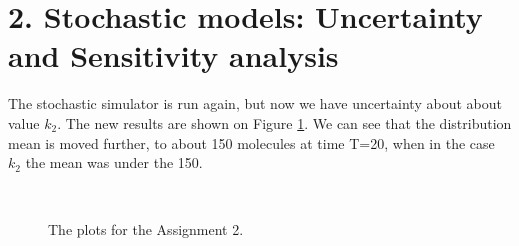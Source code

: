 \documentclass[a4paper,english]{article}
\begin{document}
\section*{2. Stochastic models: Uncertainty and Sensitivity analysis}

The stochastic simulator is run again, but now we have uncertainty about about value $k_2$. The new results are shown on Figure \ref{fig:sim-2}. We can see that the distribution mean is moved further, to about 150 molecules at time T=20, when in the case $k_2$ the mean was under the 150.

\begin{figure}[htp]
  \centering

  \\
  \caption{The plots for the Assignment 2.}\label{fig:sim-2}
  
\end{figure}
\end{document}
